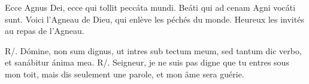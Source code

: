 
\begin{paracol}{2}

\LigneParacol{0cm}
{Ecce Agnus Dei, ecce qui tollit peccáta mundi. Beáti qui ad cenam Agni vocáti sunt.}
{Voici l’Agneau de Dieu, qui enlève les péchés du monde. Heureux les invités au repas de l'Agneau.}

\LigneParacol{0cm}
{R/. Dómine, non sum dignus, ut intres sub tectum meum, sed tantum dic verbo, et sanábitur ánima mea.}
{R/. Seigneur, je ne suis pas digne que tu entres sous mon toit, mais dis seulement une parole, et mon âme sera guérie.}

\end{paracol}
